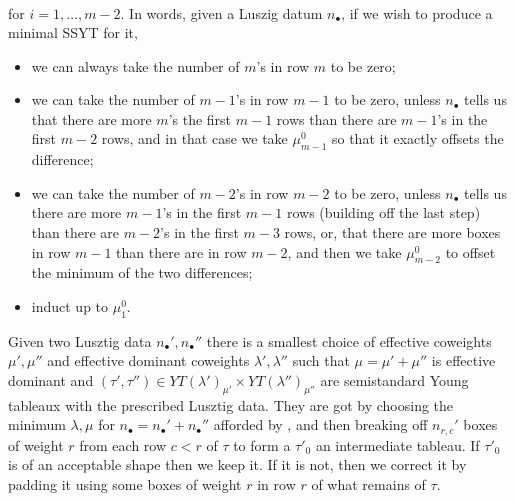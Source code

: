 \documentclass[draft]{article}
\begin{document}
\begin{lemma}
\[\begin{gathered}
        \end{gathered}
    \]
    for $i = 1,\dots,m-2$. 
    In words, given a Luszig datum $n_\bullet$, if we wish to produce a minimal SSYT for it, 
    \begin{itemize}
        \item we can always take the number of $m$'s in row $m$ to be zero; 
        \item we can take the number of $m-1$'s in row $m-1$ to be zero, unless $n_\bullet$ tells us that there are more $m$'s the first $m-1$ rows than there are $m-1$'s in the first $m-2$ rows, and in that case we take $\mu^0_{m-1}$ so that it exactly offsets the difference; 
        \item we can take the number of $m-2$'s in row $m-2$ to be zero, unless $n_\bullet$ tells us there are more $m-1$'s in the first $m-1$ rows (building off the last step) than there are $m-2$'s in the first $m-3$ rows, or, that there are more boxes in row $m-1$ than there are in row $m-2$, and then we take $\mu^0_{m-2}$ to offset the minimum of the two differences; 
        \item induct up to $\mu^0_1$. 
    \end{itemize}
\end{lemma}

\begin{proposition}
    \label{prop:minwts}
    Given two Lusztig data $n_\bullet',n_\bullet''$ there is a smallest choice of effective coweights $\mu',\mu''$ and effective dominant coweights $\lambda',\lambda''$ such that $\mu = \mu' + \mu''$ is effective dominant and $(\tau',\tau'')\in YT(\lambda')_{\mu'}\times YT(\lambda'')_{\mu''}$ are semistandard Young tableaux with the prescribed Lusztig data. They are got by choosing the minimum $\lambda,\mu$ for $n_\bullet = n_\bullet ' + n_\bullet ''$ afforded by , and then breaking off $n_{r,c}'$ boxes of weight $r$ from each row $c<r$ of $\tau$ to form a $\tau'_0$ an intermediate tableau. If $\tau'_0$ is of an acceptable shape then we keep it. If it is not, then we correct it by padding it using some boxes of weight $r$ in row $r$ of what remains of $\tau$.

\end{proposition}
\end{document}
